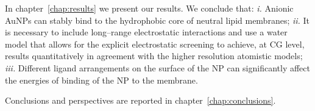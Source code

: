 In chapter~\ref{chap:results} we present our results. We conclude that: \textit{i.} Anionic \acp{AuNP} can stably bind to the hydrophobic core of neutral lipid membranes; \textit{ii.} It is necessary to include long--range electrostatic interactions and use a water model that allows for the explicit electrostatic screening to achieve, at \ac{CG} level, results quantitatively in agreement with the higher resolution atomistic models; \textit{iii.} Different ligand arrangements on the surface of the \ac{NP} can significantly affect the energies of binding of the \ac{NP} to the membrane.

Conclusions and perspectives are reported in chapter~\ref{chap:conclusions}.

\restoretoc
\endgroup
